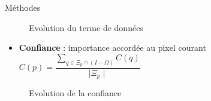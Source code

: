 \documentclass[final,hyperref={pdfpagelabels=false}]{beamer}
\begin{document}
\begin{frame}[t]
\begin{columns}[t]
\begin{column}{.465\textwidth}
\begin{block}{\Large Méthodes}
\begin{itemize}
\begin{figure}[H]
\centering
{}
\caption{Evolution du terme de données}
\end{figure}

\begin{itemize}
\item \textbf{Confiance} : importance accordée au pixel courant $C(p) = \dfrac{\sum_{q\in \Xi_p \cap(I-\Omega)} C(q)}{\mid \Xi_p\mid} $
\end{itemize}
\begin{figure}[H]
\centering
{}
\caption{Evolution de la confiance}
\end{figure}




\end{itemize}
\end{block}
\end{column}
\end{columns}
\end{frame}
\end{document}

